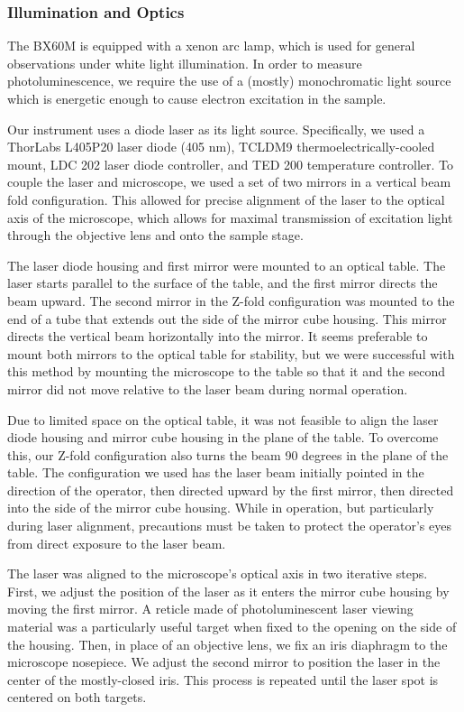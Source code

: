 \subsubsection{Illumination and Optics}
The BX60M is equipped with a xenon arc lamp, which is used for general observations under white light illumination. In order to measure photoluminescence, we require the use of a (mostly) monochromatic light source which is energetic enough to cause electron excitation in the sample. 

Our instrument uses a diode laser as its light source. Specifically, we used a ThorLabs L405P20 laser diode (405 nm), TCLDM9 thermoelectrically-cooled mount, LDC 202 laser diode controller, and TED 200 temperature controller. To couple the laser and microscope, we used a set of two mirrors in a vertical beam fold configuration. This allowed for precise alignment of the laser to the optical axis of the microscope, which allows for maximal transmission of excitation light through the objective lens and onto the sample stage.

The laser diode housing and first mirror were mounted to an optical table. The laser starts parallel to the surface of the table, and the first mirror directs the beam upward. The second mirror in the Z-fold configuration was mounted to the end of a tube that extends out the side of the mirror cube housing. This mirror directs the vertical beam horizontally into the mirror. It seems preferable to mount both mirrors to the optical table for stability, but we were successful with this method by mounting the microscope to the table so that it and the second mirror did not move relative to the laser beam during normal operation.

Due to limited space on the optical table, it was not feasible to align the laser diode housing and mirror cube housing in the plane of the table. To overcome this, our Z-fold configuration also turns the beam 90 degrees in the plane of the table. The configuration we used has the laser beam initially pointed in the direction of the operator, then directed upward by the first mirror, then directed into the side of the mirror cube housing. While in operation, but particularly during laser alignment, precautions must be taken to protect the operator's eyes from direct exposure to the laser beam.

The laser was aligned to the microscope's optical axis in two iterative steps. First, we adjust the position of the laser as it enters the mirror cube housing by moving the first mirror. A reticle made of photoluminescent laser viewing material was a particularly useful target when fixed to the opening on the side of the housing. Then, in place of an objective lens, we fix an iris diaphragm to the microscope nosepiece. We adjust the second mirror to position the laser in the center of the mostly-closed iris. This process is repeated until the laser spot is centered on both targets.

